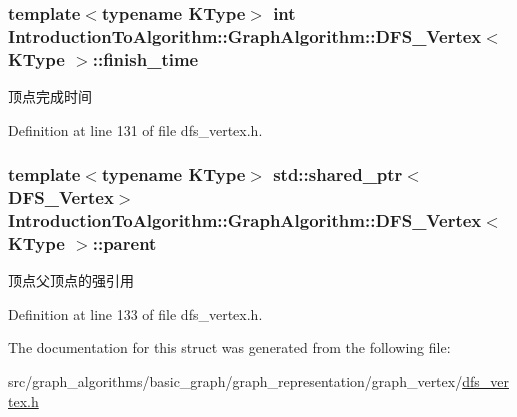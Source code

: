 \subsubsection[{finish\+\_\+time}]{\setlength{\rightskip}{0pt plus 5cm}template$<$typename K\+Type$>$ int {\bf Introduction\+To\+Algorithm\+::\+Graph\+Algorithm\+::\+D\+F\+S\+\_\+\+Vertex}$<$ K\+Type $>$\+::finish\+\_\+time}\label{struct_introduction_to_algorithm_1_1_graph_algorithm_1_1_d_f_s___vertex_aa0f17c70784c1dcc199487e519814e61}
顶点完成时间 

Definition at line 131 of file dfs\+\_\+vertex.\+h.

\hypertarget{struct_introduction_to_algorithm_1_1_graph_algorithm_1_1_d_f_s___vertex_ad243c81b3c0705a136b6a1e5debdb6ed}{}
\subsubsection[{parent}]{\setlength{\rightskip}{0pt plus 5cm}template$<$typename K\+Type$>$ std\+::shared\+\_\+ptr$<${\bf D\+F\+S\+\_\+\+Vertex}$>$ {\bf Introduction\+To\+Algorithm\+::\+Graph\+Algorithm\+::\+D\+F\+S\+\_\+\+Vertex}$<$ K\+Type $>$\+::parent}\label{struct_introduction_to_algorithm_1_1_graph_algorithm_1_1_d_f_s___vertex_ad243c81b3c0705a136b6a1e5debdb6ed}
顶点父顶点的强引用 

Definition at line 133 of file dfs\+\_\+vertex.\+h.



The documentation for this struct was generated from the following file\+:\begin{DoxyCompactItemize}
\item 
src/graph\+\_\+algorithms/basic\+\_\+graph/graph\+\_\+representation/graph\+\_\+vertex/\hyperlink{dfs__vertex_8h}{dfs\+\_\+vertex.\+h}\end{DoxyCompactItemize}
